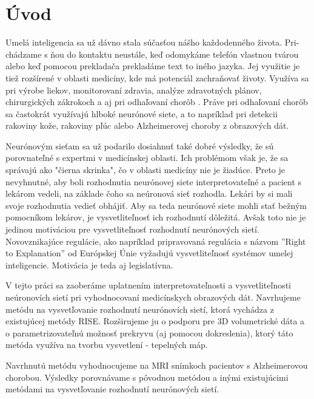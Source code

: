\chapter{Úvod}


Umelá inteligencia sa už dávno stala súčasťou nášho každodenného života. Pri-chádzame s ňou do kontaktu neustále, keď odomykáme telefón vlastnou tvárou alebo keď pomocou prekladača prekladáme text to iného jazyka. 
Jej využitie je tiež rozšírené v oblasti medicíny, kde má potenciál zachraňovať životy. Využíva sa pri výrobe liekov, monitorovaní zdravia, analýze zdravotných plánov, chirurgických zákrokoch a aj pri odhaľovaní chorôb \cite{amisha2019overview}.
Práve pri odhaľovaní chorôb sa častokrát využívajú hlboké neurónové siete, a to napríklad pri detekcii rakoviny kože, rakoviny pľúc alebo Alzheimerovej choroby z obrazových dát.

Neurónovým sieťam sa už podarilo dosiahnuť také dobré výsledky, že sú porovnateľné s expertmi v medicínskej oblasti.
Ich problémom však je, že sa správajú ako "čierna skrinka", čo v oblasti medicíny nie je žiadúce. Preto je nevyhnutné, aby boli rozhodnutia neurónovej siete interpretovateľné a pacient s lekárom vedeli, na základe čoho sa neúronová sieť rozhodla. Lekári by si mali svoje rozhodnutia vedieť obhájiť. Aby sa teda neurónové siete mohli stať bežným pomocníkom lekárov, je vysvetliteľnosť ich rozhodnutí dôležitá. Avšak toto nie je jedinou motiváciou pre vysvetliteľnosť rozhodnutí neurónových sietí. Novovznikajúce regulácie, ako napríklad pripravovaná regulácia s názvom ''Right to Explanation'' od Európskej Únie \cite{gilpin2018explaining} vyžadujú vysvetliteľnosť systémov umelej inteligencie. Motivácia je teda aj legislatívna.

V tejto práci sa zaoberáme uplatnením interpretovateľnosti a vysvetliteľnosti neúronovích sietí pri vyhodnocovaní medicínskych obrazových dát. Navrhujeme metódu na vysvetľovanie rozhodnutí neurónovích sietí, ktorá vychádza z existujúcej metódy RISE. Rozširujeme ju o podporu pre 3D volumetrické dáta a o parametrizovateľnú možnosť prekryvu (aj pomocou dokreslenia), ktorý táto metóda využíva na tvorbu vysvetlení - tepelných máp.

Navrhnutú metódu vyhodnocujeme na MRI snímkoch pacientov s Alzheimerovou chorobou. Výsledky porovnávame s pôvodnou metódou a inými existujúcimi metódami na vysvetľovanie rozhodnutí neurónových sietí.